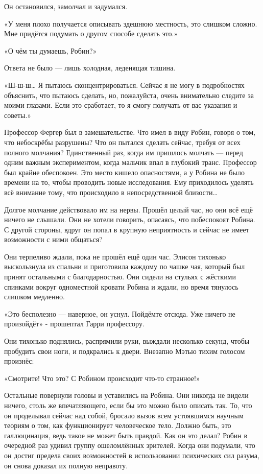 \documentclass[a5paper, 9pt,
final, openany, twoside=true]{memoir}
\begin{document}
Он остановился, замолчал и задумался.

«У меня плохо получается описывать здешнюю местность, это слишком сложно. Мне придётся подумать о другом способе сделать это.»

«О чём ты думаешь, Робин?»

Ответа не было — лишь холодная, леденящая тишина.

«Ш-ш-ш… Я пытаюсь сконцентрироваться. Сейчас я не могу в подробностях объяснить, что пытаюсь сделать, но, пожалуйста, очень внимательно следите за моими глазами. Если это сработает, то я смогу получать от вас указания и советы.»

Профессор Фергер был в замешательстве. Что имел в виду Робин, говоря о том, что небоскрёбы разрушены? Что он пытался сделать сейчас, требуя от всех полного молчания?  Единственный раз, когда им пришлось молчать — перед одним важным экспериментом, когда мальчик впал в глубокий транс. Профессор был крайне обеспокоен. Это место кишело опасностями, а у Робина не было времени на то, чтобы проводить новые исследования. Ему приходилось уделять всё внимание тому, что происходило в непосредственной близости…\bigskip

Долгое молчание действовало им на нервы. Прошёл целый час, но они всё ещё ничего не слышали. Они не хотели говорить, опасаясь, что побеспокоят Робина. С другой стороны, вдруг он попал в крупную неприятность и сейчас не имеет возможности с ними общаться?

Они терпеливо ждали, пока не прошёл ещё один час. Элисон тихонько выскользнула из спальни и приготовила каждому по чашке чая, который был принят остальными с благодарностью. Они сидели на стульях с жёсткими спинками вокруг одноместной кровати Робина и ждали, но время тянулось слишком медленно.

«Это бесполезно — наверное, он уснул. Пойдёмте отсюда. Уже ничего не произойдёт» - прошептал Гарри профессору.

Они тихонько поднялись, распрямили руки, выждали несколько секунд, чтобы пробудить свои ноги, и подкрались к двери. Внезапно Мэтью тихим голосом произнёс:

«Смотрите! Что это? С Робином происходит что-то странное!»

Остальные повернули головы и уставились на Робина. Они никогда не видели ничего, столь же впечатляющего, если бы это можно было описать так. То, что он проделывал сейчас над собой, бросало вызов всем устоявшимся научным теориям о том, как функционирует человеческое тело. Должно быть, это галлюцинация, ведь такое не может быть правдой. Как он это делал? Робин в очередной раз удивил группу ошеломлённых зрителей. Когда они подумали, что он достиг предела своих возможностей в использовании психических сил разума, он снова доказал их полную неправоту.\bigskip
\end{document}
